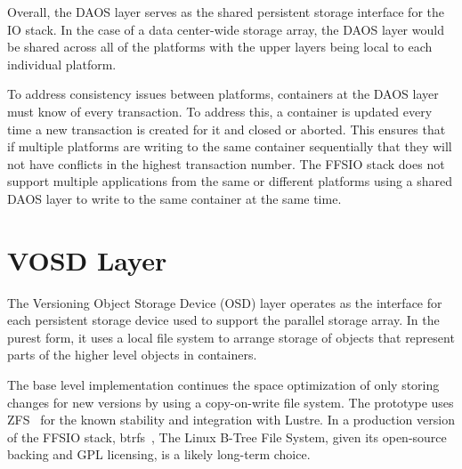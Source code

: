 \documentclass{sig-alt-gov2}
\begin{document}

Overall, the DAOS layer serves as the shared persistent storage interface for
the IO stack. In the case of a data center-wide storage array, the DAOS layer
would be shared across all of the platforms with the upper layers being local
to each individual platform.

To address consistency issues between platforms, containers at the DAOS layer
must know of every transaction. To address this, a container is updated every
time a new transaction is created for it and closed or aborted. This ensures
that if multiple platforms are writing to the same container sequentially that
they will not have conflicts in the highest transaction number. The FFSIO stack
does not support multiple applications from the same or different platforms
using a shared DAOS layer to write to the same container at the same time.

\section{VOSD Layer}
\label{sec:vosd}

The Versioning Object Storage Device (OSD) layer operates as the interface for
each persistent storage device used to support the parallel storage array. In
the purest form, it uses a local file system to arrange storage of objects that
represent parts of the higher level objects in containers.

The base level implementation continues the space optimization of only storing
changes for new versions by using a copy-on-write file system. The prototype
uses ZFS~\cite{zhang:2010:zfs} for the known stability and integration with
Lustre. In a production version of the FFSIO stack,
btrfs~\cite{rodeh:2013:btrfs}, The Linux B-Tree File System, given its
open-source backing and GPL licensing, is a likely long-term choice.

%
%
\end{document}
